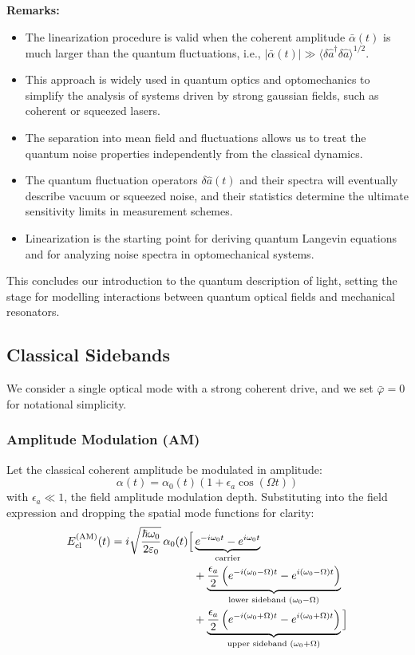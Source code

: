\noindent \textbf{Remarks:} 
\begin{itemize}
  \item The linearization procedure is valid when the coherent amplitude $\bar{\alpha}(t)$ is much larger than the quantum fluctuations, i.e., $|\bar{\alpha}(t)| \gg \langle \delta\hat{a}^\dagger \delta\hat{a} \rangle^{1/2}$.
  \item This approach is widely used in quantum optics and optomechanics to simplify the analysis of systems driven by strong gaussian fields, such as coherent or squeezed lasers.
  \item The separation into mean field and fluctuations allows us to treat the quantum noise properties independently from the classical dynamics.
  \item The quantum fluctuation operators $\delta\hat{a}(t)$ and their spectra will eventually describe vacuum or squeezed noise, and their statistics determine the ultimate sensitivity limits in measurement schemes.
  \item Linearization is the starting point for deriving quantum Langevin equations and for analyzing noise spectra in optomechanical systems.
\end{itemize}



\vspace{1em}
This concludes our introduction to the quantum description of light, setting the stage for modelling interactions between quantum optical fields and mechanical resonators.

\subsection{Classical Sidebands}

We consider a single optical mode with a strong coherent drive, and we set $\bar{\varphi}=0$ for notational simplicity.

\subsubsection*{Amplitude Modulation (AM)}

Let the classical coherent amplitude be modulated in amplitude:
\begin{equation}
  \alpha(t) = \alpha_0(t) \left(1 + \epsilon_a \cos(\Omega t)\right)
\end{equation}
with $\epsilon_a \ll 1$, the field amplitude modulation depth. Substituting into the field expression and dropping the spatial mode functions for clarity:
\begin{align}
  E_{\text{cl}}^{\text{(AM)}}(t) =
  i \sqrt{\frac{\hbar \omega_0}{2 \varepsilon_0}}\,\alpha_0(t) \Big[
  &\underbrace{e^{-i\omega_0 t} - e^{i\omega_0 t}}_{\text{carrier}} \notag \\
  &+ \underbrace{\frac{\epsilon_a}{2} \left( e^{-i(\omega_0 - \Omega)t} - e^{i(\omega_0 - \Omega)t} \right)}_{\text{lower sideband } (\omega_0 - \Omega)} \notag \\
  &+ \underbrace{\frac{\epsilon_a}{2} \left( e^{-i(\omega_0 + \Omega)t} - e^{i(\omega_0 + \Omega)t} \right)}_{\text{upper sideband } (\omega_0 + \Omega)}
  \Big]
\end{align}

